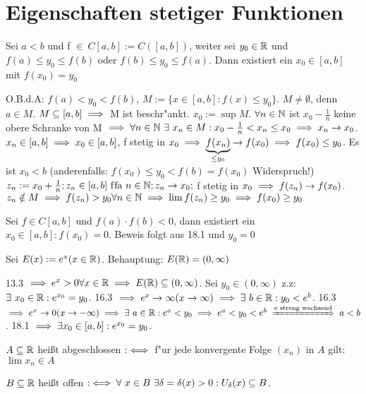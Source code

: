 \documentclass[a4paper,twoside,DIV15,BCOR12mm]{scrbook}
\begin{document}
\chapter{Eigenschaften stetiger Funktionen}

\begin{satz}[Zwischenwertsatz]
Sei $a<b$ und f $\in\ C[a, b]:=C([a, b])$, weiter sei $y_0 \in\mathbb{R}$ und $f(a) \le y_0 \le f(b)$ oder $f(b) \le y_0 \le f(a)$. Dann existiert ein $x_0 \in [a, b]$ mit $f(x_0)=y_0$
\end{satz}

\begin{beweis}
O.B.d.A: $f(a)<y_0<f(b)$, $M:=\{x \in [a,b]: f(x)\le y_0\}$. $M \ne \emptyset $, denn $a \in M$. $M \subseteq [a, b] \implies$ M ist beschr"ankt. $x_0:=\sup M$. $\forall n \in \mathbb{N}$ ist $x_0 - \frac{1}{n}$ keine obere Schranke von M $\implies \forall n\in\mathbb{N}\ \exists\ x_n\in M: x_0 - \frac{1}{n}<x_n\le x_0 \implies x_n \to x_0$. $x_n \in [a, b] \implies x_0 \in [a, b]$, f stetig in $x_0 \implies \underbrace{f(x_n)}_{\le y_0} \to f(x_0) \implies f(x_0)\le y_0$. Es ist $x_0<b$ (anderenfalls: $f(x_0) \le y_0 < f(b)=f(x_0)$ Widerspruch!) $z_n:=x_0+\frac{1}{n}; z_n \in [a, b] \text{ f\/fa } n\in\mathbb{N}; z_n \to x_0;$ f stetig in $x_0 \implies f(z_n) \to f(x_0)$. $z_n \notin M \implies f(z_n)>y_0 \forall n \in\mathbb{N} \implies \lim f(z_n) \ge y_0 \implies f(x_0) \ge y_0$
\end{beweis}

\begin{satz}
Sei $f \in C[a, b]$ und $f(a) \cdot f(b)<0$, dann existiert ein $x_0 \in [a, b]: f(x_0)=0$. Beweis folgt aus 18.1 und $y_0=0$
\end{satz}

\begin{anwendung}
Sei $E(x):=e^x (x \in\mathbb{R})$. Behauptung: $E(\mathbb{R})=(0, \infty)$
\end{anwendung}

\begin{beweis}
13.3 $\implies e^x>0 \forall x \in \mathbb{R} \implies E(\mathbb{R}) \subseteq (0, \infty)$. Sei $y_0 \in (0, \infty)$ z.z: $\exists\ x_0 \in \mathbb{R} : e^{x_0}=y_0$. 16.3 $\implies e^x \to \infty (x\to \infty) \implies \exists\ b \in\mathbb{R} : y_0 < e^b$. 16.3 $\folgt e^x \to 0 (x \to -\infty) \folgt \exists\ a \in\MdR : e^a < y_0 \folgt e^a < y_0 < e^b \folgtnach{e streng wachsend} a<b$. 18.1 $\implies \exists x_0 \in [a, b]: e^{x_0}=y_0$.
 \end{beweis}

\begin{definition*}
\item $A \subseteq \mathbb{R}$ heißt abgeschlossen $:\iff$ f"ur jede konvergente Folge $(x_n)$ in $A$ gilt: $\lim x_n \in A$
\item $B \subseteq \mathbb{R}$ heißt offen $:\iff \forall\ x \in B \ \exists \delta=\delta(x)>0 : U_\delta(x) \subseteq B$.
\end{definition*}
\end{document}
